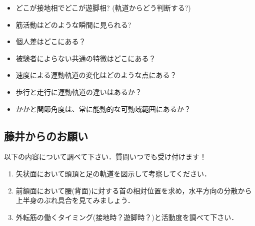 \documentclass{jarticle}
\begin{document}
\begin{enumerate}
\begin{itemize}
\item どこが接地相でどこが遊脚相? (軌道からどう判断する?)
\item 筋活動はどのような瞬間に見られる?
\item 個人差はどこにある？
\item 被験者によらない共通の特徴はどこにある？
\item 速度による運動軌道の変化はどのような点にある？
\item 歩行と走行に運動軌道の違いはあるか？
\item かかと関節角度は、常に能動的な可動域範囲にあるか？
\end{itemize}



\subsection{藤井からのお願い}
以下の内容について調べて下さい．質問いつでも受け付けます！
\begin{enumerate}
\item 矢状面において頭頂と足の軌道を図示して考察してください．
\item 前額面において腰(背面)に対する首の相対位置を求め，水平方向の分散から上半身のぶれ具合を見てみましょう．
\item 外転筋の働くタイミング(接地時？遊脚時？)と活動度を調べて下さい．
\end{enumerate}


\end{enumerate}
\end{document}
